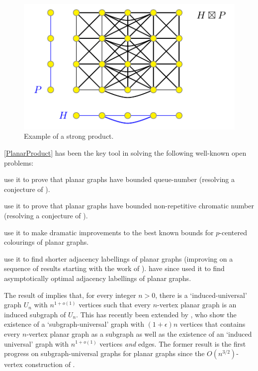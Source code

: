 \documentclass{patmorin}
\begin{document}
\begin{figure}[!h]
\centering
\includegraphics{ProductExample}
\caption{Example of a strong product.
\label{ProductExample}}
\end{figure}

\noindent\cref{PlanarProduct} has been the key tool in solving the following well-known open problems:
\begin{compactitem}
\item \citet{DJMMUW20} use it to prove that planar graphs have bounded queue-number (resolving a conjecture of \citet{HLR92}).
\item  \citet{dujmovic.esperet.ea:planar} use it to prove that planar graphs have bounded non-repetitive chromatic number (resolving a conjecture of \citet{AGHR-RSA02}).
\item \citet{DFMS21} use it to make dramatic improvements to the best known bounds for $p$-centered colourings of planar graphs.
\item \citet{bonamy.gavoille.ea:shorter} use it to find shorter adjacency labellings of planar graphs (improving on a sequence of results starting with the work of \citet{kannan.naor.ea:implicit-stoc,kannan.naor.ea:implicit}). \citet{DEJGMM21} have since used it to find asymptotically optimal adjacency labellings of planar graphs.
\item The result of \citet{DEJGMM21} implies that, for every integer
$n>0$, there is a `induced-universal' graph $U_n$ with $n^{1+o(1)}$ vertices such that every $n$-vertex planar graph is an induced
subgraph of $U_n$. This has recently been extended by \citet{EJM}, who show the existence of a `subgraph-universal' graph with $(1+\epsilon)n$ vertices that contains every $n$-vertex planar graph as a subgraph as well as the existence of an `induced universal' graph with $n^{1+o(1)}$ vertices \emph{and} edges.  The former result is the first progress on subgraph-universal graphs for planar graphs since the $O(n^{3/2})$-vertex construction of \citet{babai.chung.ea:on}.
\end{compactitem}
\end{document}
